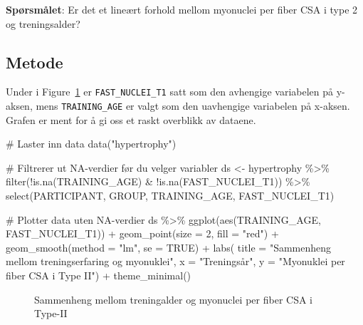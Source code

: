 \documentclass[
  letterpaper,
  DIV=11,
  numbers=noendperiod]{scrreprt}
\newenvironment{Shaded}{\begin{snugshade}}{\end{snugshade}}
\newcommand{\AttributeTok}[1]{\textcolor[rgb]{0.40,0.45,0.13}{#1}}
\newcommand{\CommentTok}[1]{\textcolor[rgb]{0.37,0.37,0.37}{#1}}
\newcommand{\ConstantTok}[1]{\textcolor[rgb]{0.56,0.35,0.01}{#1}}
\newcommand{\DecValTok}[1]{\textcolor[rgb]{0.68,0.00,0.00}{#1}}
\newcommand{\FunctionTok}[1]{\textcolor[rgb]{0.28,0.35,0.67}{#1}}
\newcommand{\NormalTok}[1]{\textcolor[rgb]{0.00,0.23,0.31}{#1}}
\newcommand{\OtherTok}[1]{\textcolor[rgb]{0.00,0.23,0.31}{#1}}
\newcommand{\SpecialCharTok}[1]{\textcolor[rgb]{0.37,0.37,0.37}{#1}}
\newcommand{\StringTok}[1]{\textcolor[rgb]{0.13,0.47,0.30}{#1}}
\begin{document}
\textbf{Spørsmålet}: Er det et lineært forhold mellom myonuclei per
fiber CSA i type 2 og treningsalder?

\subsection{Metode}\label{metode-3}

Under i Figure~\ref{fig-plot-training-age-myonuclei} er
\texttt{FAST\_NUCLEI\_T1} satt som den avhengige variabelen på y-aksen,
mens \texttt{TRAINING\_AGE} er valgt som den uavhengige variabelen på
x-aksen. Grafen er ment for å gi oss et raskt overblikk av dataene.

\begin{Shaded}
\begin{Highlighting}[]
\CommentTok{\# Laster inn data}
\FunctionTok{data}\NormalTok{(}\StringTok{"hypertrophy"}\NormalTok{)}

\CommentTok{\# Filtrerer ut NA{-}verdier før du velger variabler}
\NormalTok{ds }\OtherTok{\textless{}{-}}\NormalTok{ hypertrophy }\SpecialCharTok{\%\textgreater{}\%}
  \FunctionTok{filter}\NormalTok{(}\SpecialCharTok{!}\FunctionTok{is.na}\NormalTok{(TRAINING\_AGE) }\SpecialCharTok{\&} \SpecialCharTok{!}\FunctionTok{is.na}\NormalTok{(FAST\_NUCLEI\_T1)) }\SpecialCharTok{\%\textgreater{}\%}
  \FunctionTok{select}\NormalTok{(PARTICIPANT, GROUP, TRAINING\_AGE, FAST\_NUCLEI\_T1)}

\CommentTok{\# Plotter data uten NA{-}verdier}
\NormalTok{ds }\SpecialCharTok{\%\textgreater{}\%} 
  \FunctionTok{ggplot}\NormalTok{(}\FunctionTok{aes}\NormalTok{(TRAINING\_AGE, FAST\_NUCLEI\_T1)) }\SpecialCharTok{+}
  \FunctionTok{geom\_point}\NormalTok{(}\AttributeTok{size =} \DecValTok{2}\NormalTok{, }\AttributeTok{fill =} \StringTok{"red"}\NormalTok{) }\SpecialCharTok{+}
  \FunctionTok{geom\_smooth}\NormalTok{(}\AttributeTok{method =} \StringTok{"lm"}\NormalTok{, }\AttributeTok{se =} \ConstantTok{TRUE}\NormalTok{) }\SpecialCharTok{+}
  \FunctionTok{labs}\NormalTok{(}
    \AttributeTok{title =} \StringTok{"Sammenheng mellom treningserfaring og myonuklei"}\NormalTok{,}
    \AttributeTok{x =} \StringTok{"Treningsår"}\NormalTok{, }
    \AttributeTok{y =} \StringTok{"Myonuklei per fiber CSA i Type II"}\NormalTok{) }\SpecialCharTok{+}
  \FunctionTok{theme\_minimal}\NormalTok{()}
\end{Highlighting}
\end{Shaded}

\begin{figure}[H]


\caption{\label{fig-plot-training-age-myonuclei}Sammenheng mellom
treningalder og myonuclei per fiber CSA i Type-II}

\end{figure}%
\end{document}
